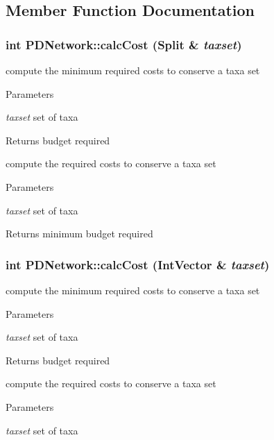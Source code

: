 \subsection{Member Function Documentation}
\hypertarget{classPDNetwork_a14b0a52d17495905424fb42b81d61af3}{
\subsubsection[{calcCost}]{\setlength{\rightskip}{0pt plus 5cm}int PDNetwork::calcCost ({\bf Split} \& {\em taxset})}}
\label{classPDNetwork_a14b0a52d17495905424fb42b81d61af3}
compute the minimum required costs to conserve a taxa set 
\begin{DoxyParams}{Parameters}
\item[{\em taxset}]set of taxa \end{DoxyParams}
\begin{DoxyReturn}{Returns}
budget required
\end{DoxyReturn}
compute the required costs to conserve a taxa set 
\begin{DoxyParams}{Parameters}
\item[{\em taxset}]set of taxa \end{DoxyParams}
\begin{DoxyReturn}{Returns}
minimum budget required 
\end{DoxyReturn}
\hypertarget{classPDNetwork_ad93961e85ba88b91ce1afce0ba594fa7}{
\subsubsection[{calcCost}]{\setlength{\rightskip}{0pt plus 5cm}int PDNetwork::calcCost (IntVector \& {\em taxset})}}
\label{classPDNetwork_ad93961e85ba88b91ce1afce0ba594fa7}
compute the minimum required costs to conserve a taxa set 
\begin{DoxyParams}{Parameters}
\item[{\em taxset}]set of taxa \end{DoxyParams}
\begin{DoxyReturn}{Returns}
budget required
\end{DoxyReturn}
compute the required costs to conserve a taxa set 
\begin{DoxyParams}{Parameters}
\item[{\em taxset}]set of taxa \end{DoxyParams}
